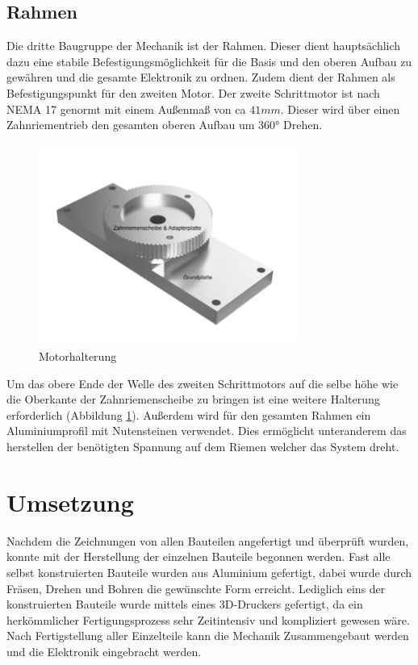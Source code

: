 \subsection{Rahmen}
Die dritte Baugruppe der Mechanik ist der Rahmen. Dieser dient hauptsächlich dazu eine stabile Befestigungsmöglichkeit für die Basis und den oberen Aufbau zu gewähren und die gesamte Elektronik zu ordnen. Zudem dient der Rahmen als Befestigungspunkt für den zweiten Motor. Der zweite Schrittmotor ist nach \ac{NEMA} 17 genormt mit einem Außenmaß von ca $41mm$. Dieser wird über einen Zahnriementrieb den gesamten oberen Aufbau um 360° Drehen. 
\begin{figure}[H]
	\centering
	\includegraphics[width=0.75\textwidth]{images/Mechanik/Basis}
	\caption{Motorhalterung}
	\label{motorhalterung}
\end{figure}
Um das obere Ende der Welle des zweiten Schrittmotors auf die selbe höhe wie die Oberkante der Zahnriemenscheibe zu bringen ist eine weitere Halterung erforderlich (Abbildung \ref{motorhalterung}). Außerdem wird für den gesamten Rahmen ein Aluminiumprofil mit Nutensteinen verwendet. Dies ermöglicht unteranderem das herstellen der benötigten Spannung auf dem Riemen welcher das System dreht. 
\section{Umsetzung}
Nachdem die Zeichnungen von allen Bauteilen angefertigt und überprüft wurden, konnte mit der Herstellung der einzelnen Bauteile begonnen werden. Fast alle selbst konstruierten Bauteile wurden aus Aluminium gefertigt, dabei wurde durch Fräsen, Drehen und Bohren die gewünschte Form erreicht. Lediglich eins der konstruierten Bauteile wurde mittels eines 3D-Druckers gefertigt, da ein herkömmlicher Fertigungsprozess sehr Zeitintensiv und kompliziert gewesen wäre. Nach Fertigstellung aller Einzelteile kann die Mechanik Zusammengebaut werden und die Elektronik eingebracht werden.
